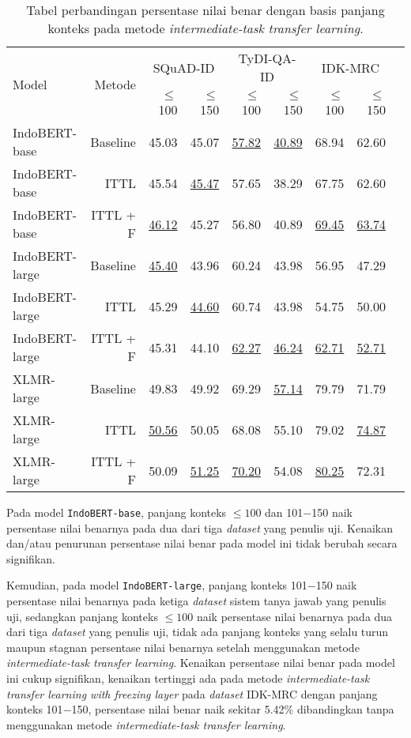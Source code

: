 \begin{table}[H]\centering
\begin{tabular}{lrrrrrrrr}\toprule
\multirow{2}{*}{Model} &\multirow{2}{*}{Metode} &\multicolumn{2}{c}{SQuAD-ID} &\multicolumn{2}{c}{TyDI-QA-ID} &\multicolumn{2}{c}{IDK-MRC} \\\cmidrule{3-8}
& &$\leq$100 &$\leq$150 &$\leq$100 &$\leq$150 &$\leq$100 &$\leq$150 \\\midrule
IndoBERT-base &Baseline &45.03 &45.07 &\underline{57.82} &\underline{40.89} &68.94 &62.60 \\
IndoBERT-base &ITTL &45.54 &\underline{45.47} &57.65 &38.29 &67.75 &62.60 \\
IndoBERT-base &ITTL + F &\underline{46.12} &45.27 &56.80 &40.89 &\underline{69.45} &\underline{63.74} \\
\hline
IndoBERT-large &Baseline &\underline{45.40} &43.96 &60.24 &43.98 &56.95 &47.29 \\
IndoBERT-large &ITTL &45.29 &\underline{44.60} &60.74 &43.98 &54.75 &50.00 \\
IndoBERT-large &ITTL + F &45.31 &44.10 &\underline{62.27} &\underline{46.24} &\underline{62.71} &\underline{52.71} \\
\hline
XLMR-large &Baseline &49.83 &49.92 &69.29 &\underline{57.14} &79.79 &71.79 \\
XLMR-large &ITTL &\underline{50.56} &50.05 &68.08 &55.10 &79.02 &\underline{74.87} \\
XLMR-large &ITTL + F &50.09 &\underline{51.25} &\underline{70.20} &54.08 &\underline{80.25} &72.31 \\
\bottomrule
\end{tabular}
\caption{Tabel perbandingan persentase nilai benar dengan basis panjang konteks pada metode \emph{intermediate-task transfer learning}.}
\end{table}

Pada model \texttt{IndoBERT-base}, panjang konteks $\leq100$ dan 101$-$150 naik persentase nilai benarnya pada dua dari tiga \emph{dataset} yang penulis uji. Kenaikan dan/atau penurunan persentase nilai benar pada model ini tidak berubah secara signifikan.

Kemudian, pada model \texttt{IndoBERT-large}, panjang konteks 101$-$150 naik persentase nilai benarnya pada ketiga \emph{dataset} sistem tanya jawab yang penulis uji, sedangkan panjang konteks $\leq100$ naik persentase nilai benarnya pada dua dari tiga \emph{dataset} yang penulis uji, tidak ada panjang konteks yang selalu turun maupun stagnan persentase nilai benarnya setelah menggunakan metode \emph{intermediate-task transfer learning}. Kenaikan persentase nilai benar pada model ini cukup signifikan, kenaikan tertinggi ada pada metode \emph{intermediate-task transfer learning with freezing layer} pada \emph{dataset} IDK-MRC dengan panjang konteks 101$-$150, persentase nilai benar naik sekitar 5.42\% dibandingkan tanpa menggunakan metode \emph{intermediate-task transfer learning}.

